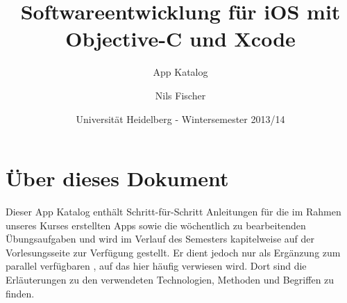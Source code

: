 \documentclass[parskip=half, final]{scrreprt}
\subtitle{App Katalog}
\title{Softwareentwicklung für iOS mit Objective-C und Xcode}
\author{Nils Fischer}
\date{Universität Heidelberg - Wintersemester 2013/14}
\begin{document}
\maketitle

\tableofcontents


\chapter{Über dieses Dokument}

Dieser App Katalog enthält Schritt-für-Schritt Anleitungen für die im Rahmen unseres Kurses erstellten Apps sowie die wöchentlich zu bearbeitenden Übungsaufgaben und wird im Verlauf des Semesters kapitelweise auf der Vorlesungsseite  zur Verfügung gestellt. Er dient jedoch nur als Ergänzung zum parallel verfügbaren , auf das hier häufig verwiesen wird. Dort sind die Erläuterungen zu den verwendeten Technologien, Methoden und Begriffen zu finden.
\end{document}
